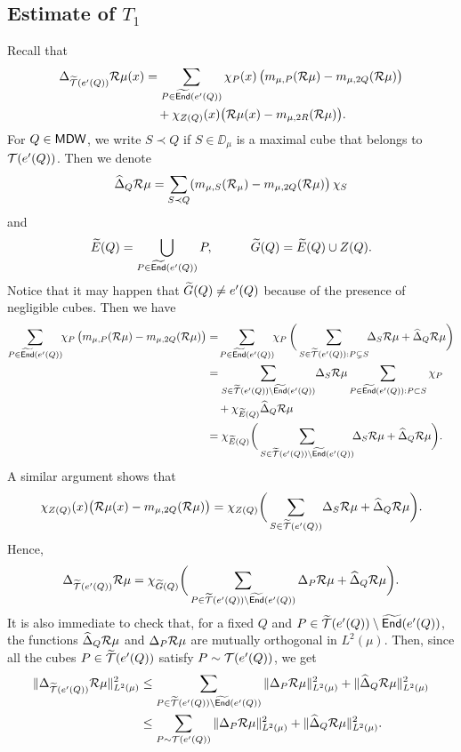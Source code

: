 \vv

\subsection{Estimate of \texorpdfstring{$T_1$}{T1}}
Recall that 
\begin{align*}
\Delta_{{\widetilde{{\mathcal T}}}(e'(Q))}{\mathcal R}\mu(x) & = \sum_{P\in{\widetilde{{\mathsf{End}}}}(e'(Q))} \chi_P(x)\,\big(m_{\mu,P}({\mathcal R}\mu) - m_{\mu,2Q}({\mathcal R}\mu)\big)\\
&\quad +  \chi_{Z(Q)}(x) \big({\mathcal R}\mu(x) -  m_{\mu,2R}({\mathcal R}\mu)\big).
\end{align*}
For $Q\in{\mathsf{MDW}}$, we write $S\prec Q$ if $S\in\DD_\mu$ is a maximal cube that belongs to ${\mathcal T}(e'(Q))$. Then we denote
$${\widehat{\Delta}}_Q{\mathcal R}\mu = \sum_{S\prec Q} (m_{\mu,S}({\mathcal R}_\mu) - m_{\mu,2Q}({\mathcal R}\mu)\big)\,\chi_S$$
and 
$${\widetilde{E}}(Q) = \bigcup_{P\in{\widetilde{{\mathsf{End}}}}(e'(Q))} P,\qquad\quad {\widetilde{G}}(Q) = {\widetilde{E}}(Q) \cup Z(Q)
.$$
Notice that it may happen that ${\widetilde{G}}(Q)\neq e'(Q)$ because of the presence of negligible cubes.
Then we have
\begin{align*}
\sum_{P\in\wt\End(e'(Q))} \!\!\chi_P\,\big(m_{\mu,P}(\RR\mu) - m_{\mu,2Q}(\RR\mu)\big)  &=\!
\sum_{P\in\wt\End(e'(Q))}\!\! \chi_P\,\bigg(\sum_{S\in \wt\TT(e'(Q)):P\subsetneq S}\!\! \Delta_{S}\RR\mu
+ \wh\Delta_Q\RR\mu\bigg)\\
& = \sum_{S\in \wt\TT(e'(Q))\setminus \wt \End(e'(Q))}\!\Delta_{S}\RR\mu \sum_{P\in\wt\End(e'(Q)):P\subset S} \chi_P \\
&\quad + \chi_{\wt E(Q)}\wh\Delta_Q\RR\mu\\
&= \chi_{\wt E(Q)}\bigg(\sum_{S\in \wt\TT(e'(Q))\setminus \wt \End(e'(Q))}\!\! \Delta_{S}\RR\mu
+ \wh\Delta_Q\RR\mu\bigg).
\end{align*}
A similar argument shows that
$$\chi_{Z(Q)}(x) \big({\mathcal R}\mu(x) -  m_{\mu,2Q}({\mathcal R}\mu)\big) = \chi_{Z(Q)}\bigg(\sum_{S\in {\widetilde{{\mathcal T}}}(e'(Q))}\! \Delta_{S}{\mathcal R}\mu
+ {\widehat{\Delta}}_Q{\mathcal R}\mu\bigg).$$
Hence,
$$\Delta_{{\widetilde{{\mathcal T}}}(e'(Q))}{\mathcal R}\mu = \chi_{{\widetilde{G}}(Q)}\bigg(\sum_{P\in{\widetilde{{\mathcal T}}}(e'(Q))\setminus {\widetilde{{\mathsf{End}}}}(e'(Q))} \Delta_P {\mathcal R}\mu + {\widehat{\Delta}}_Q{\mathcal R}\mu\bigg).$$ 
It is also immediate to check that, for a fixed $Q$ and $P\in{\widetilde{{\mathcal T}}}(e'(Q))\setminus {\widetilde{{\mathsf{End}}}}(e'(Q))$, the functions 
${\widehat{\Delta}}_Q{\mathcal R}\mu$ and $\Delta_P {\mathcal R}\mu$ are mutually orthogonal in $L^2(\mu)$. Then, since all the cubes $P\in{\widetilde{{\mathcal T}}}(e'(Q))$ satisfy 
$P\sim{\mathcal T}(e'(Q))$, we get
\begin{align*}
\|\Delta_{{\widetilde{{\mathcal T}}}(e'(Q))} {\mathcal R}\mu\|_{L^2(\mu)}^2 & \leq
\sum_{P\in{\widetilde{{\mathcal T}}}(e'(Q))\setminus {\widetilde{{\mathsf{End}}}}(e'(Q))}\| \Delta_P {\mathcal R}\mu\|_{L^2(\mu)}^2  + \|{\widehat{\Delta}}_Q{\mathcal R}\mu\|_{L^2(\mu)}^2 \\
& \leq \sum_{P\sim{\mathcal T}(e'(Q))} \|\Delta_P {\mathcal R}\mu\|_{L^2(\mu)}^2  + \|{\widehat{\Delta}}_Q{\mathcal R}\mu\|_{L^2(\mu)}^2.
\end{align*}

